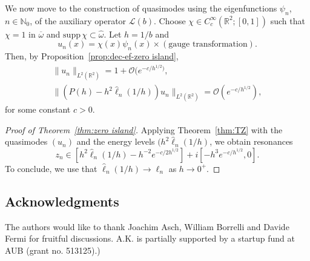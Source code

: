 \documentclass[11pt]{amsart}
\theoremstyle{remark}
\newcommand{\R}{\mathbb{R}}
\numberwithin{equation}{section}
\begin{document}
We now move to the construction of quasimodes using the eigenfunctions $\psi_n$, $n\in\mathbb N_0$, of the auxiliary operator $\mathcal L(b)$. Choose $\chi\in C_c^\infty(\R^2;[0,1])$  such that $\chi=1$ in $\overline\omega$ and $\mathrm{supp\,}\chi\subset\hat\omega$. Let $h=1/b$ and
\[u_n(x)=\chi(x)\psi_n(x)\times (\mbox{gauge transformation}).\]
Then, by Proposition~\ref{prop:dec-ef-zero island},
\[
\begin{gathered}
    \|u_n\|_{L^2(\R^2)}=1+\mathcal O(e^{-c/h^{1/2})},\\
    \|(P(h)-h^2\hat\ell_n(1/h))u_n\|_{L^2(\R^2)}=\mathcal O(e^{-c/h^{1/2}}),
\end{gathered}
\]
for some constant $c>0$. 

\begin{proof}[Proof of Theorem~\ref{thm:zero island}]
Applying Theorem~\ref{thm:TZ}  with the quasimodes $(u_n)$ and the energy levels $(h^2\hat\ell_n(1/h)$, we obtain resonances
\[z_n\in [h^2\hat\ell_n(1/h)-h^{-2}e^{-c/2h^{1/2}}]+i[ -h^3e^{-c/h^{1/2}},0].\]
To conclude, we use that $\hat\ell_n(1/h)\to \ell_n$ as $h\to0^+$.
\end{proof}

\subsection*{Acknowledgments} The authors would like to thank Joachim Asch,  William Borrelli and Davide Fermi for fruitful discussions. A.K.  is partially supported by a startup fund at AUB (grant no. 513125).)
\end{document}
